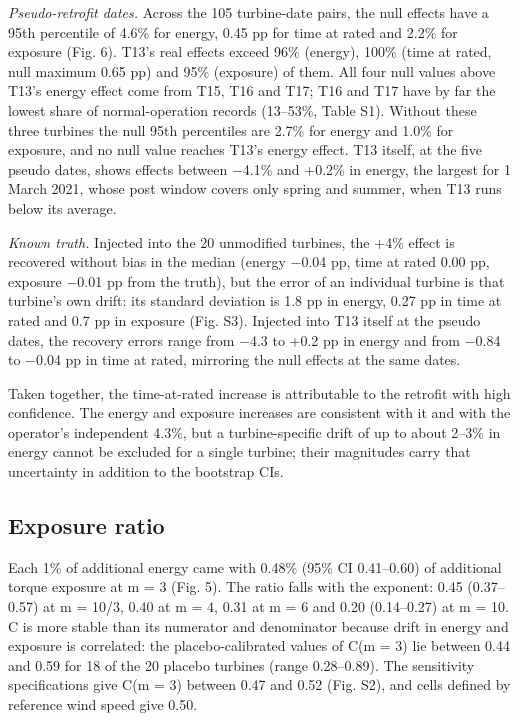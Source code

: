 \documentclass[preprint,12pt]{elsarticle}
\begin{document}
\emph{Pseudo-retrofit dates.} Across the 105 turbine-date pairs, the null effects have a 95th percentile of 4.6\% for energy, 0.45 pp for time at rated and 2.2\% for exposure (Fig. 6). T13's real effects exceed 96\% (energy), 100\% (time at rated, null maximum 0.65 pp) and 95\% (exposure) of them. All four null values above T13's energy effect come from T15, T16 and T17; T16 and T17 have by far the lowest share of normal-operation records (13--53\%, Table S1). Without these three turbines the null 95th percentiles are 2.7\% for energy and 1.0\% for exposure, and no null value reaches T13's energy effect. T13 itself, at the five pseudo dates, shows effects between −4.1\% and +0.2\% in energy, the largest for 1 March 2021, whose post window covers only spring and summer, when T13 runs below its average.

\emph{Known truth.} Injected into the 20 unmodified turbines, the +4\% effect is recovered without bias in the median (energy −0.04 pp, time at rated 0.00 pp, exposure −0.01 pp from the truth), but the error of an individual turbine is that turbine's own drift: its standard deviation is 1.8 pp in energy, 0.27 pp in time at rated and 0.7 pp in exposure (Fig. S3). Injected into T13 itself at the pseudo dates, the recovery errors range from −4.3 to +0.2 pp in energy and from −0.84 to −0.04 pp in time at rated, mirroring the null effects at the same dates.

Taken together, the time-at-rated increase is attributable to the retrofit with high confidence. The energy and exposure increases are consistent with it and with the operator's independent 4.3\%, but a turbine-specific drift of up to about 2--3\% in energy cannot be excluded for a single turbine; their magnitudes carry that uncertainty in addition to the bootstrap CIs.

\subsection{Exposure ratio}

Each 1\% of additional energy came with 0.48\% (95\% CI 0.41--0.60) of additional torque exposure at m = 3 (Fig. 5). The ratio falls with the exponent: 0.45 (0.37--0.57) at m = 10/3, 0.40 at m = 4, 0.31 at m = 6 and 0.20 (0.14--0.27) at m = 10. C is more stable than its numerator and denominator because drift in energy and exposure is correlated: the placebo-calibrated values of C(m = 3) lie between 0.44 and 0.59 for 18 of the 20 placebo turbines (range 0.28--0.89). The sensitivity specifications give C(m = 3) between 0.47 and 0.52 (Fig. S2), and cells defined by reference wind speed give 0.50.
\end{document}
